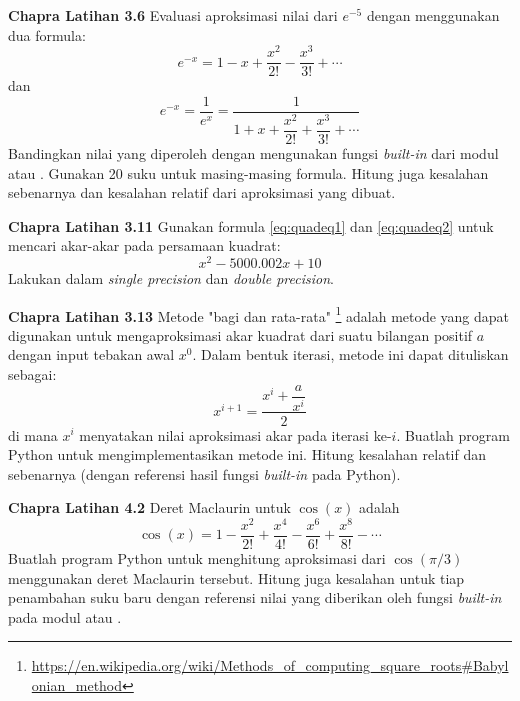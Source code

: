 \begin{soal}
\textbf{Chapra Latihan 3.6}
Evaluasi aproksimasi nilai dari $e^{-5}$ dengan menggunakan dua formula:
\begin{equation}
e^{-x} = 1 - x + \frac{x^2}{2!} - \frac{x^3}{3!} + \cdots
\end{equation}
dan
\begin{equation}
e^{-x} = \frac{1}{e^{x}} = \frac{1}{1 + x + \dfrac{x^2}{2!} + \dfrac{x^3}{3!} + \cdots}
\end{equation}
Bandingkan nilai yang diperoleh dengan mengunakan fungsi \textit{built-in} dari modul
 atau . Gunakan 20 suku untuk masing-masing formula.
Hitung juga kesalahan sebenarnya dan kesalahan relatif dari aproksimasi yang dibuat.
\end{soal}


\begin{soal}
\textbf{Chapra Latihan 3.11}
Gunakan formula \eqref{eq:quadeq1} dan \eqref{eq:quadeq2} untuk mencari akar-akar
pada persamaan kuadrat:
\begin{equation*}
x^2 - 5000.002x + 10
\end{equation*}
Lakukan dalam \textit{single precision} dan \textit{double precision}.
\end{soal}


\begin{soal}
\textbf{Chapra Latihan 3.13}
Metode "bagi dan rata-rata"
\footnote{{\scriptsize\url{https://en.wikipedia.org/wiki/Methods_of_computing_square_roots\#Babylonian_method}}}
adalah metode yang dapat digunakan untuk
mengaproksimasi akar kuadrat dari suatu bilangan positif $a$ dengan input
tebakan awal $x^{0}$. 
Dalam bentuk iterasi, metode ini dapat dituliskan sebagai:
\begin{equation}
x^{i+1} = \dfrac{x^{i} + \dfrac{a}{x^{i}}}{2}
\end{equation}
di mana $x^{i}$ menyatakan nilai aproksimasi akar pada iterasi ke-$i$.
Buatlah program Python untuk mengimplementasikan metode ini.
Hitung kesalahan relatif dan sebenarnya (dengan referensi hasil fungsi
\textit{built-in}  pada Python).
\end{soal}

\begin{soal}
\textbf{Chapra Latihan 4.2}
Deret Maclaurin untuk $\cos(x)$ adalah
\begin{equation*}
\cos(x) = 1 - \frac{x^2}{2!} + \frac{x^4}{4!} - \frac{x^6}{6!} + \frac{x^8}{8!} - \cdots
\end{equation*}
Buatlah program Python untuk menghitung aproksimasi dari $\cos(\pi/3)$ menggunakan deret
Maclaurin tersebut. Hitung juga kesalahan untuk tiap penambahan suku baru dengan referensi
nilai yang diberikan oleh fungsi \textit{built-in} pada modul  atau
.
\end{soal}


